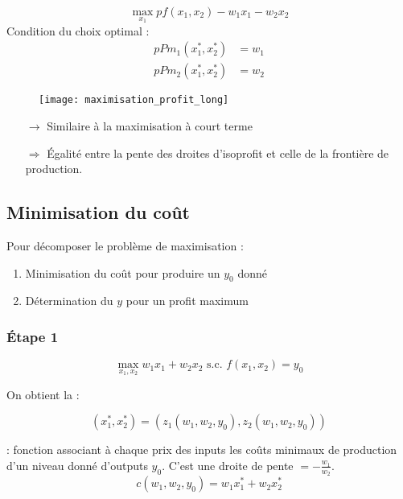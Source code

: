 \begin{equation*}
\max_{x_1} p f(x_1,x_2) - w_1x_1 - w_2x_2
\end{equation*}
Condition du choix optimal :
\begin{align*}
pPm_1(x_1^*, x_2^*) &= w_1\\
pPm_2(x_1^*, x_2^*) &= w_2
\end{align*}
\begin{figure}[H]
	\centering
	\texttt{[image: maximisation\_profit\_long]}
\end{figure}
\begin{itemize}
\item[$\rightarrow$] Similaire à la maximisation à court terme
\item[$\Rightarrow$] Égalité entre la pente des droites d'isoprofit et celle de la frontière de production.
\end{itemize}

\subsection{Minimisation du coût}

Pour décomposer le problème de maximisation :
\begin{enumerate}
\item Minimisation du coût pour produire un $y_0$ donné
\item Détermination du $y$ pour un profit maximum
\end{enumerate}

\subsubsection{Étape 1}
\begin{equation*}
\max_{x_1, x_2} w_1 x_1 + w_2 x_2 \text{ s.c. } f(x_1, x_2) = y_0
\end{equation*}

On obtient la  :

\begin{equation*}
(x_1^*, x_2^*) = (z_1(w_1,w_2,y_0),z_2(w_1,w_2,y_0))
\end{equation*}

 : fonction associant à chaque prix des inputs les coûts minimaux de production d'un niveau donné d'outputs $y_0$. C'est une droite de pente $= -\frac{w_1}{w_2}$.
\begin{equation*}
c(w_1, w_2, y_0) = w_1x^*_1 + w_2x^*_2
\end{equation*}

